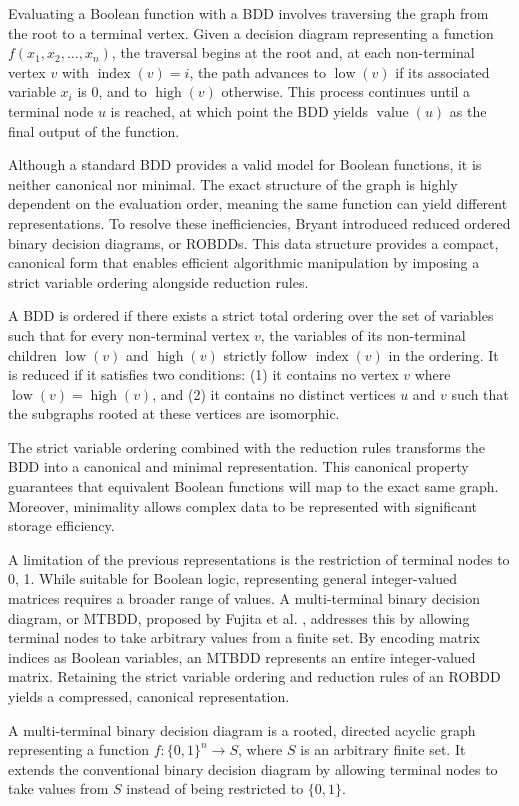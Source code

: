 Evaluating a Boolean function with a BDD involves traversing the graph from the root to a terminal vertex. Given a decision diagram representing a function $f(x_{1}, x_{2}, \dots, x_{n})$, the traversal begins at the root and, at each non-terminal vertex $v$ with $\operatorname{index}(v) = i$, the path advances to $\operatorname{low}(v)$ if its associated variable $x_{i}$ is $0$, and to $\operatorname{high}(v)$ otherwise. This process continues until a terminal node $u$ is reached, at which point the BDD yields $\operatorname{value}(u)$ as the final output of the function.

Although a standard BDD provides a valid model for Boolean functions, it is neither canonical nor minimal. The exact structure of the graph is highly dependent on the evaluation order, meaning the same function can yield different representations. To resolve these inefficiencies, Bryant \cite{Bryant1986} introduced reduced ordered binary decision diagrams, or ROBDDs. This data structure provides a compact, canonical form that enables efficient algorithmic manipulation by imposing a strict variable ordering alongside reduction rules.

\begin{definition}
A BDD is ordered if there exists a strict total ordering over the set of variables such that for every non-terminal vertex $v$, the variables of its non-terminal children $\operatorname{low}(v)$ and $\operatorname{high}(v)$ strictly follow $\operatorname{index}(v)$ in the ordering. It is reduced if it satisfies two conditions: (1) it contains no vertex $v$ where $\operatorname{low}(v) = \operatorname{high}(v)$, and (2) it contains no distinct vertices $u$ and $v$ such that the subgraphs rooted at these vertices are isomorphic.
\end{definition}

The strict variable ordering combined with the reduction rules transforms the BDD into a canonical and minimal representation. This canonical property guarantees that equivalent Boolean functions will map to the exact same graph. Moreover, minimality allows complex data to be represented with significant storage efficiency.

A limitation of the previous representations is the restriction of terminal nodes to {0, 1}. While suitable for Boolean logic, representing general integer-valued matrices requires a broader range of values. A multi-terminal binary decision diagram, or MTBDD, proposed by Fujita et al. \cite{FujitaEtAl1997}, addresses this by allowing terminal nodes to take arbitrary values from a finite set. By encoding matrix indices as Boolean variables, an MTBDD represents an entire integer-valued matrix. Retaining the strict variable ordering and reduction rules of an ROBDD yields a compressed, canonical representation.

\begin{definition}
    A multi-terminal binary decision diagram is a rooted, directed acyclic graph representing a function $f: \{0, 1\}^n \to S$, where $S$ is an arbitrary finite set. It extends the conventional binary decision diagram by allowing terminal nodes to take values from $S$ instead of being restricted to $\{0, 1\}$.
\end{definition}